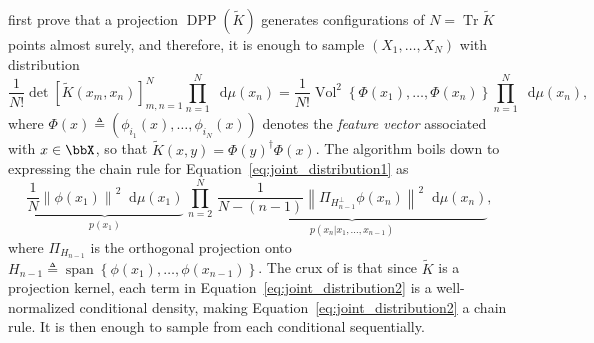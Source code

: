 \documentclass[twoside,11pt]{article}
\newcommand\DPP{\operatorname{DPP}}
\newcommand*{\Eqref}[1]{Equation~\ref{#1}}
\renewcommand{\tilde}{\widetilde}
\newcommand\Vol{\operatorname{Vol}}
\newcommand*\diff{\mathop{}\!\mathrm{d}}
\newcommand{\lrb}[1]{\left[ #1 \right]}
\newcommand{\lrp}[1]{\left( #1 \right)}
\newcommand{\lrcb}[1]{\left\{ #1 \right\}}
\newcommand{\lrnorm}[1]{\left\| #1 \right\|}
\newcommand\Span{\operatorname{span}}
\newcommand\Tr{\operatorname{Tr}}
\begin{document}
	  \cite{HKPV06} first prove that a projection $\DPP(\tilde{K})$ generates configurations of $N=\Tr \tilde{K}$ points almost surely, and therefore, it is enough to sample $(X_1,\dots,X_N)$ with distribution
	  \begin{equation}
	  \label{eq:joint_distribution1}
	    \frac{1}{N!}
	      \det \lrb{\tilde K(x_m,x_n)}_{m,n=1}^N
	        \prod_{n=1}^N\diff \mu(x_n)
	    = \frac{1}{N!}
	        \Vol^2\lrcb{\Phi(x_1),\dots,\Phi(x_n)}
	          \prod_{n=1}^N \diff\mu(x_n),
	  \end{equation}
	  where $\Phi(x) \triangleq \lrp{\phi_{i_1}(x),\dots,\phi_{i_N}(x)}$ denotes the \emph{feature vector} associated with $x\in\bbX$, so that $\tilde{K}(x,y) = \Phi(y)^{\dagger} \Phi(x)$.
	  The algorithm boils down to expressing the chain rule for \Eqref{eq:joint_distribution1} as
	  \begin{equation}
	  \label{eq:joint_distribution2}
	    \underbrace{
	      \frac{1}{N}
	        \lrnorm{\phi(x_1)}^2
	          \diff\mu(x_1)
	      }_{p(x_1)}
	    \,\prod_{n=2}^{N}\,
	    \underbrace{
	      \frac{1}{N-(n-1)}
	        \lrnorm{ \Pi_{H_{n-1}^{\perp}} \phi(x_n)}^2\!\!
	          \diff\mu(x_n)
	      }_{p(x_n\vert x_1,\dots,x_{n-1})},
	  \end{equation}
	  where $\Pi_{H_{n-1}}$ is the orthogonal projection onto $H_{n-1} \triangleq \Span\lrcb{\phi(x_1), \dots, \phi(x_{n-1}) }$.
	  The crux of \citet[Algorithm 18]{HKPV06} is that since $\tilde K$ is a projection kernel, each term in \Eqref{eq:joint_distribution2} is a well-normalized conditional density, making \Eqref{eq:joint_distribution2} a chain rule.
	  It is then enough to sample from each conditional sequentially.
\end{document}
